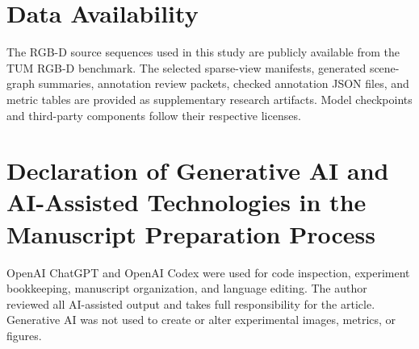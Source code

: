 \section*{Data Availability}

The RGB-D source sequences used in this study are publicly available from the TUM
RGB-D benchmark. The selected sparse-view manifests, generated scene-graph summaries,
annotation review packets, checked annotation JSON files, and metric tables are
provided as supplementary research artifacts. Model checkpoints and third-party
components follow their respective licenses.

\section*{Declaration of Generative AI and AI-Assisted Technologies in the Manuscript Preparation Process}

OpenAI ChatGPT and OpenAI Codex were used for code inspection, experiment bookkeeping,
manuscript organization, and language editing. The author reviewed all AI-assisted
output and takes full responsibility for the article. Generative AI was not used to
create or alter experimental images, metrics, or figures.
